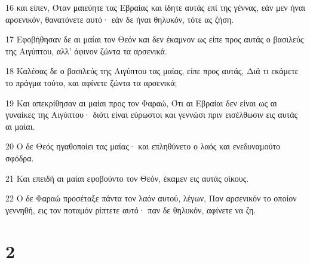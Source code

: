 \par 16 και είπεν, Όταν μαιεύητε τας Εβραίας και ίδητε αυτάς επί της γέννας, εάν μεν ήναι αρσενικόν, θανατόνετε αυτό· εάν δε ήναι θηλυκόν, τότε ας ζήση.
\par 17 Εφοβήθησαν δε αι μαίαι τον Θεόν και δεν έκαμνον ως είπε προς αυτάς ο βασιλεύς της Αιγύπτου, αλλ' άφινον ζώντα τα αρσενικά.
\par 18 Καλέσας δε ο βασιλεύς της Αιγύπτου τας μαίας, είπε προς αυτάς, Διά τι εκάμετε το πράγμα τούτο, και αφίνετε ζώντα τα αρσενικά;
\par 19 Και απεκρίθησαν αι μαίαι προς τον Φαραώ, Ότι αι Εβραίαι δεν είναι ως αι γυναίκες της Αιγύπτου· διότι είναι εύρωστοι και γεννώσι πριν εισέλθωσιν εις αυτάς αι μαίαι.
\par 20 Ο δε Θεός ηγαθοποίει τας μαίας· και επληθύνετο ο λαός και ενεδυναμούτο σφόδρα.
\par 21 Και επειδή αι μαίαι εφοβούντο τον Θεόν, έκαμεν εις αυτάς οίκους.
\par 22 Ο δε Φαραώ προσέταξε πάντα τον λαόν αυτού, λέγων, Παν αρσενικόν το οποίον γεννηθή, εις τον ποταμόν ρίπτετε αυτό· παν δε θηλυκόν, αφίνετε να ζη.

\chapter{2}

